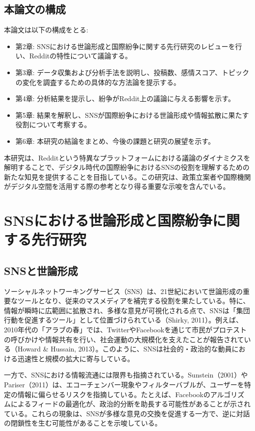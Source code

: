 \documentclass[11pt, a4j]{jreport}
\begin{document}
    \section{本論文の構成}
    本論文は以下の構成をとる: 
    \begin{itemize}
        \item 第2章: SNSにおける世論形成と国際紛争に関する先行研究のレビューを行い、Redditの特性について議論する。
        \item 第3章: データ収集および分析手法を説明し、投稿数、感情スコア、トピックの変化を調査するための具体的な方法論を提示する。
        \item 第4章: 分析結果を提示し、紛争がReddit上の議論に与える影響を示す。
        \item 第5章: 結果を解釈し、SNSが国際紛争における世論形成や情報拡散に果たす役割について考察する。
        \item 第6章: 本研究の結論をまとめ、今後の課題と研究の展望を示す。
    \end{itemize}

    本研究は、Redditという特異なプラットフォームにおける議論のダイナミクスを解明することで、デジタル時代の国際紛争におけるSNSの役割を理解するための新たな知見を提供することを目指している。この研究は、政策立案者や国際機関がデジタル空間を活用する際の参考となり得る重要な示唆を含んでいる。

    \chapter{SNSにおける世論形成と国際紛争に関する先行研究}

    \section{SNSと世論形成}
    ソーシャルネットワーキングサービス（SNS）は、21世紀において世論形成の重要なツールとなり、従来のマスメディアを補完する役割を果たしている。特に、情報が瞬時に広範囲に拡散され、多様な意見が可視化される点で、SNSは「集団行動を促進するツール」として位置づけられている（Shirky, 2011）。例えば、2010年代の「アラブの春」では、TwitterやFacebookを通じて市民がプロテストの呼びかけや情報共有を行い、社会運動の大規模化を支えたことが報告されている（Howard & Hussain, 2013）。このように、SNSは社会的・政治的な動員における迅速性と規模の拡大に寄与している。

    一方で、SNSにおける情報流通には限界も指摘されている。Sunstein（2001）やPariser（2011）は、エコーチェンバー現象やフィルターバブルが、ユーザーを特定の情報に偏らせるリスクを指摘している。たとえば、Facebookのアルゴリズムによるフィードの最適化が、政治的分断を助長する可能性があることが示されている。これらの現象は、SNSが多様な意見の交換を促進する一方で、逆に対話の閉鎖性を生む可能性があることを示唆している。
\end{document}
